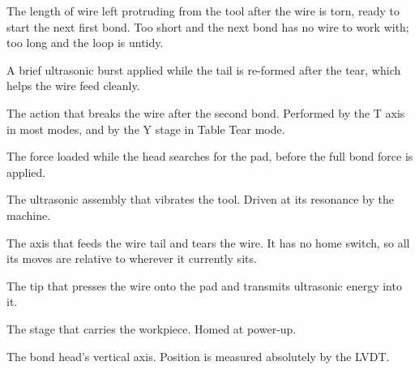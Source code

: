 \begin{description}[leftmargin=!,labelwidth=32mm,style=nextline,font=\normalfont\bfseries]
\item[Tail] The length of wire left protruding from the tool after the wire is
  torn, ready to start the next first bond. Too short and the next bond has no
  wire to work with; too long and the loop is untidy.

\item[Tail assist] A brief ultrasonic burst applied while the tail is
  re-formed after the tear, which helps the wire feed cleanly.

\item[Tear] The action that breaks the wire after the second bond. Performed
  by the T axis in most modes, and by the Y stage in Table Tear mode.

\item[Tracking force] The force loaded while the head searches for the pad,
  before the full bond force is applied.

\item[Transducer] The ultrasonic assembly that vibrates the tool. Driven at
  its resonance by the machine.

\item[T axis] The axis that feeds the wire tail and tears the wire. It has no
  home switch, so all its moves are relative to wherever it currently sits.

\item[Wedge (tool)] The tip that presses the wire onto the pad and transmits
  ultrasonic energy into it.

\item[Y axis] The stage that carries the workpiece. Homed at power-up.

\item[Z axis] The bond head's vertical axis. Position is measured absolutely
  by the LVDT.

\end{description}
